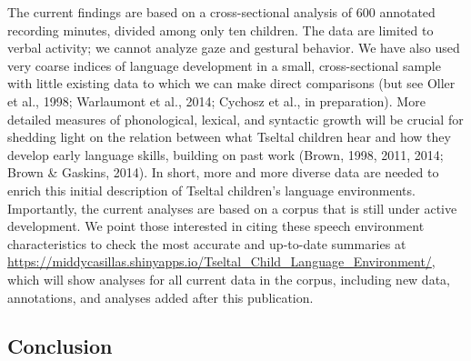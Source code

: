 \documentclass[floatsintext,man]{apa6}
\theoremstyle{definition}
\theoremstyle{definition}
\theoremstyle{definition}
\theoremstyle{remark}
\begin{document}
The current findings are based on a cross-sectional analysis of 600
annotated recording minutes, divided among only ten children. The data
are limited to verbal activity; we cannot analyze gaze and gestural
behavior. We have also used very coarse indices of language development
in a small, cross-sectional sample with little existing data to which we
can make direct comparisons (but see Oller et al., 1998; Warlaumont et
al., 2014; Cychosz et al., in preparation). More detailed measures of
phonological, lexical, and syntactic growth will be crucial for shedding
light on the relation between what Tseltal children hear and how they
develop early language skills, building on past work (Brown, 1998, 2011,
2014; Brown \& Gaskins, 2014). In short, more and more diverse data are
needed to enrich this initial description of Tseltal children's language
environments. Importantly, the current analyses are based on a corpus
that is still under active development. We point those interested in
citing these speech environment characteristics to check the most
accurate and up-to-date summaries at
\url{https://middycasillas.shinyapps.io/Tseltal_Child_Language_Environment/},
which will show analyses for all current data in the corpus, including
new data, annotations, and analyses added after this publication.

\subsection{Conclusion}\label{disc-conclusion}
\end{document}
